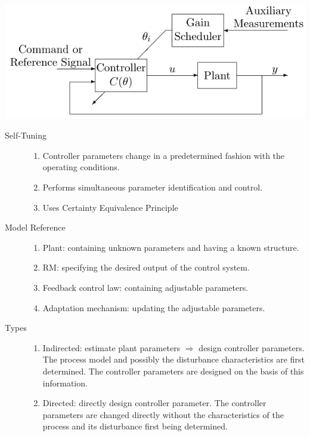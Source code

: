   \begin{center}
  \includegraphics[scale=0.5]{figure/adaptive/gain_scheduling.png}
\end{center}
  \begin{description}
    \item[Self-Tuning]
    \begin{enumerate}
      \item Controller parameters change in a predetermined fashion with the
      operating conditions.
      
      \item Performs simultaneous parameter identification and control.
      
      \item Uses Certainty Equivalence Principle
    \end{enumerate}
  \end{description}
  
  \begin{description}
    \item[Model Reference]
    \begin{enumerate}
      \item Plant: containing unknown parameters and having a known structure.
      
      \item RM: specifying the desired output of the control system.
      
      \item Feedback control law: containing adjustable parameters.
      
      \item Adaptation mechanism: updating the adjustable parameters.
    \end{enumerate}
  \end{description}
  
  \begin{description}
    \item[Types]
    \begin{enumerate}
      \item Indirected: estimate plant parameters $\Rightarrow$ design
      controller parameters. The process model and possibly the disturbance
      characteristics are first determined. The controller parameters are
      designed on the basis of this information.
      
      \item Directed: directly design controller parameter. The controller
      parameters are changed directly without the characteristics of the process
      and its disturbance first being determined.
    \end{enumerate}
  \end{description}